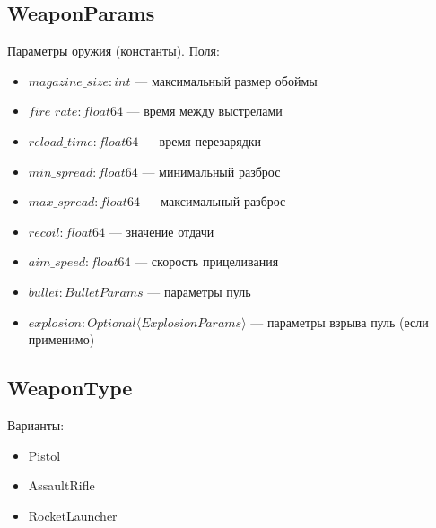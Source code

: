 \subsection{WeaponParams}
Параметры оружия (константы). Поля:
\begin{itemize}
    \item $magazine\_size : int$ --- максимальный размер обоймы
    \item $fire\_rate : float64$ --- время между выстрелами
    \item $reload\_time : float64$ --- время перезарядки
    \item $min\_spread : float64$ --- минимальный разброс
    \item $max\_spread : float64$ --- максимальный разброс
    \item $recoil : float64$ --- значение отдачи
    \item $aim\_speed : float64$ --- скорость прицеливания
    \item $bullet : BulletParams$ --- параметры пуль
    \item $explosion : Optional \langle ExplosionParams \rangle$ --- параметры взрыва пуль (если применимо)
\end{itemize}

\subsection{WeaponType}
Варианты:
\begin{itemize}
    \item Pistol
    \item AssaultRifle
    \item RocketLauncher
\end{itemize}